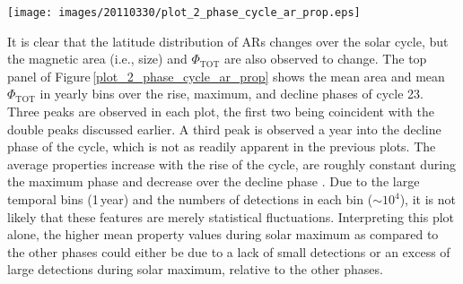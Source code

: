 \documentclass[namedreferences]{solarphysics}
\begin{document}
\begin{article}
\begin{figure*}[!ht]
\texttt{[image: images/20110330/plot\_2\_phase\_cycle\_ar\_prop.eps]}
\caption{\emph{Top}: Average magnetic feature area and $\Phi_{\mathrm{TOT}}$ in yearly, 6-month, and 3-month bins (black, dashed gray, and gray lines, respectively). Vertical red lines denote beginning and end of solar cycle phases. Arrows indicate peaks in $\langle$area$\rangle$ and $\langle\Phi\rangle$. \emph{Middle}: Distributions of detection areas for ``rise" (dashed line), ``maximum" (black line), and ``decline" (gray line) phases defined in \emph{top} panel. A power-law fit to the rise-phase distribution is indicated by the solid red line and the bounds of the fit are indicated by the vertical red dashed lines. \emph{Bottom}: Same as \emph{middle} panel, but showing $\Phi_{\mathrm{TOT}}$.}
\label{plot_2_phase_cycle_ar_prop}
\end{figure*}


It is clear that the latitude distribution of ARs changes over the solar cycle, but the magnetic area (i.e., size) and $\Phi_{\mathrm{TOT}}$ are also observed to change. The top panel of Figure\,\ref{plot_2_phase_cycle_ar_prop} shows the mean area and mean $\Phi_{\mathrm{TOT}}$ in yearly bins over the rise, maximum, and decline phases of cycle 23. Three peaks are observed in each plot, the first two being coincident with the double peaks discussed earlier. A third peak is observed a year into the decline phase of the cycle, which is not as readily apparent in the previous plots. The average properties increase with the rise of the cycle, are roughly constant during the maximum phase and decrease over the decline phase \citep[agreeing with the findings of][]{tang:1984}. Due to the large temporal bins (1\,year) and the numbers of detections in each bin ($\sim$$10^4$), it is not likely that these features are merely statistical fluctuations. Interpreting this plot alone, the higher mean property values during solar maximum as compared to the other phases could either be due to a lack of small detections or an excess of large detections during solar maximum, relative to the other phases.


\end{article}
\end{document}
